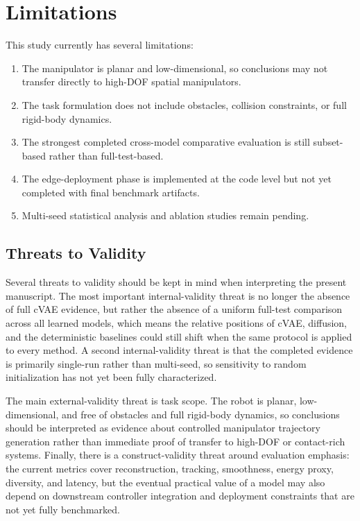 \documentclass[11pt]{article}
\begin{document}
\section{Limitations}

This study currently has several limitations:
\begin{enumerate}[leftmargin=1.5em]
    \item The manipulator is planar and low-dimensional, so conclusions may not transfer directly to high-DOF spatial manipulators.
    \item The task formulation does not include obstacles, collision constraints, or full rigid-body dynamics.
    \item The strongest completed cross-model comparative evaluation is still subset-based rather than full-test-based.
    \item The edge-deployment phase is implemented at the code level but not yet completed with final benchmark artifacts.
    \item Multi-seed statistical analysis and ablation studies remain pending.
\end{enumerate}

\subsection{Threats to Validity}

Several threats to validity should be kept in mind when interpreting the present manuscript. The most important internal-validity threat is no longer the absence of full cVAE evidence, but rather the absence of a uniform full-test comparison across all learned models, which means the relative positions of cVAE, diffusion, and the deterministic baselines could still shift when the same protocol is applied to every method. A second internal-validity threat is that the completed evidence is primarily single-run rather than multi-seed, so sensitivity to random initialization has not yet been fully characterized.

The main external-validity threat is task scope. The robot is planar, low-dimensional, and free of obstacles and full rigid-body dynamics, so conclusions should be interpreted as evidence about controlled manipulator trajectory generation rather than immediate proof of transfer to high-DOF or contact-rich systems. Finally, there is a construct-validity threat around evaluation emphasis: the current metrics cover reconstruction, tracking, smoothness, energy proxy, diversity, and latency, but the eventual practical value of a model may also depend on downstream controller integration and deployment constraints that are not yet fully benchmarked.
\end{document}
